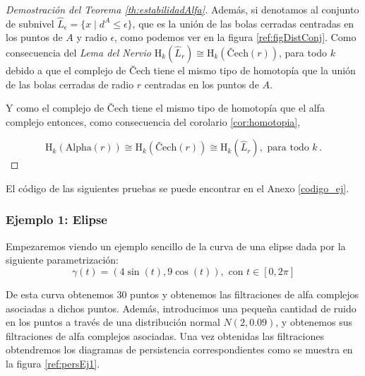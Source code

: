 \begin{proof}[Demostración del Teorema \ref{th:estabilidadAlfa}]
Además, si denotamos al conjunto de subnivel $\widehat{L}_\epsilon=\{x \mid d^A \leq \epsilon\}$, que es la unión de las bolas cerradas centradas en los puntos de $A$ y radio $\epsilon$, como podemos ver en la figura \ref{ref:figDistConj}. Como consecuencia del \emph{Lema del Nervio} $\text{H}_k(\widehat{L}_r) \cong \text{H}_k(\text{\v{C}ech}(r))$, para todo $k$ debido a que el complejo de \v{C}ech tiene el mismo tipo de homotopía que la unión de las bolas cerradas de radio $r$ centradas en los puntos de $A$.

Y como el complejo de \v{C}ech tiene el mismo tipo de homotopía que el alfa complejo entonces, como consecuencia del corolario \ref{cor:homotopia},

\[
\text{H}_k(\text{Alpha}(r)) \cong \text{H}_k(\text{\v{C}ech}(r)) \cong \text{H}_k(\widehat{L}_r), \text{ para todo } k\,.
\]
\end{proof}

El código de las siguientes pruebas se puede encontrar en el Anexo \ref{codigo_ej}.

\subsubsection{Ejemplo 1: Elipse}
Empezaremos viendo un ejemplo sencillo de la curva de una elipse dada por la siguiente parametrización:
\[
\gamma(t)= (4\sin(t), 9\cos(t)), \text{ con } t\in [0,2\pi]
\]

De esta curva obtenemos 30 puntos y obtenemos las filtraciones de alfa complejos asociadas a dichos puntos. Además, introducimos una pequeña cantidad de ruido en los puntos a través de una distribución normal $N(2, 0.09)$, y obtenemos sus filtraciones de alfa complejos asociadas. Una vez obtenidas las filtraciones obtendremos los diagramas de persistencia correspondientes como se muestra en la figura \ref{ref:persEj1}.

